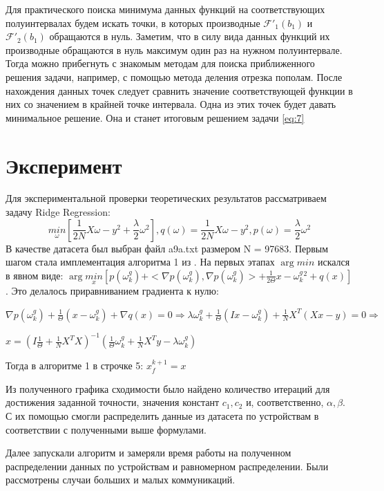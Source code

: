 \documentclass{article}
\begin{document}
Для практического поиска минимума данных функций на соответствующих полуинтервалах будем искать точки, в которых производные $\mathcal{F'}_1(b_1)$ и $\mathcal{F'}_2(b_1)$ обращаются в нуль. Заметим, что в силу вида данных функций их производные обращаются в нуль максимум один раз на нужном полуинтервале. Тогда можно прибегнуть с знакомым методам для поиска приближенного решения задачи, например, с помощью метода деления отрезка пополам. После нахождения данных точек следует сравнить значение соответствующей функции в них со значением в крайней точке интервала. Одна из этих точек будет давать минимальное решение. Она и станет итоговым решением задачи \ref{eq:7}



\section{Эксперимент}
Для экспериментальной проверки теоретических результатов рассматриваем задачу Ridge Regression: 
\begin{equation}
    \underset{\omega}{min}[ \frac{1}{2N} X\omega - y^2 + \frac{\lambda}{2}\omega^2], q(\omega) = \frac{1}{2N} X\omega - y^2, p(\omega) = \frac{\lambda}{2}\omega^2
\end{equation}
В качестве датасета был выбран файл a9a.txt размером N = 97683. Первым шагом стала имплементация алгоритма 1 из \cite{kovalev2022optimal}. 
На первых этапах $\arg min$ искался в явном виде: $\arg\underset{x}{min} [p(\omega_k^g) + <\nabla p(\omega_k^g), \nabla p(\omega_k^g)> + \frac{1}{2\Theta}x - \omega_k^g^2 + q(x)]$. Это делалось приравниванием градиента к нулю: 
\begin{center}
$\nabla p(\omega_k^g) + \frac{1}{\Theta}(x - \omega_k^g) + \nabla q(x) = 0 \Rightarrow \lambda\omega_k^g + \frac{1}{\Theta}(Ix - \omega_k^g) + \frac{1}{N}X^T(Xx - y) = 0 \Rightarrow$

    
$ x = (I \frac{1}{\Theta} + \frac{1}{N}X^TX)^{-1}(\frac{1}{\Theta} \omega_k^g + \frac{1}{N}X^Ty - \lambda\omega_k^g) $
\end{center}

Тогда в алгоритме 1 в строчке 5: $x_f^{k+1} = x$

Из полученного графика сходимости было найдено количество итераций для достижения заданной точности, значения констант $c_1, c_2$ и, соответственно, $\alpha, \beta$. С их помощью смогли распределить данные из датасета по устройствам в соответствии с полученными выше формулами. 

Далее запускали алгоритм и замеряли время работы на полученном распределении данных по устройствам и равномерном распределении. Были рассмотрены случаи больших и малых коммуникаций. 
\end{document}

